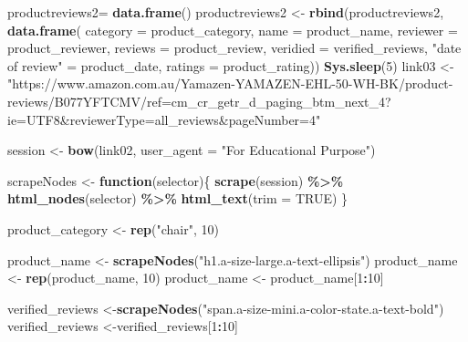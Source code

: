 \documentclass[
]{article}
\newenvironment{Shaded}{\begin{snugshade}}{\end{snugshade}}
\newcommand{\AttributeTok}[1]{\textcolor[rgb]{0.13,0.29,0.53}{#1}}
\newcommand{\ConstantTok}[1]{\textcolor[rgb]{0.56,0.35,0.01}{#1}}
\newcommand{\ControlFlowTok}[1]{\textcolor[rgb]{0.13,0.29,0.53}{\textbf{#1}}}
\newcommand{\DecValTok}[1]{\textcolor[rgb]{0.00,0.00,0.81}{#1}}
\newcommand{\FunctionTok}[1]{\textcolor[rgb]{0.13,0.29,0.53}{\textbf{#1}}}
\newcommand{\NormalTok}[1]{#1}
\newcommand{\OtherTok}[1]{\textcolor[rgb]{0.56,0.35,0.01}{#1}}
\newcommand{\SpecialCharTok}[1]{\textcolor[rgb]{0.81,0.36,0.00}{\textbf{#1}}}
\newcommand{\StringTok}[1]{\textcolor[rgb]{0.31,0.60,0.02}{#1}}
\begin{document}
\begin{Shaded}
\begin{Highlighting}[]
\NormalTok{  productreviews2}\OtherTok{=} \FunctionTok{data.frame}\NormalTok{()}
\NormalTok{  productreviews2 }\OtherTok{\textless{}{-}} \FunctionTok{rbind}\NormalTok{(productreviews2, }\FunctionTok{data.frame}\NormalTok{(}
                      \AttributeTok{category =}\NormalTok{ product\_category,}
                      \AttributeTok{name =}\NormalTok{ product\_name,}
                      \AttributeTok{reviewer =}\NormalTok{ product\_reviewer,}
                      \AttributeTok{reviews =}\NormalTok{ product\_review,}
                      \AttributeTok{veridied =}\NormalTok{ verified\_reviews,}
                      \StringTok{"date of review"} \OtherTok{=}\NormalTok{ product\_date,}
                      \AttributeTok{ratings =}\NormalTok{ product\_rating))}
   \FunctionTok{Sys.sleep}\NormalTok{(}\DecValTok{5}\NormalTok{)}
\NormalTok{link03 }\OtherTok{\textless{}{-}} \StringTok{"https://www.amazon.com.au/Yamazen{-}YAMAZEN{-}EHL{-}50{-}WH{-}BK/product{-}reviews/B077YFTCMV/ref=cm\_cr\_getr\_d\_paging\_btm\_next\_4?ie=UTF8\&reviewerType=all\_reviews\&pageNumber=4"}


\NormalTok{  session }\OtherTok{\textless{}{-}} \FunctionTok{bow}\NormalTok{(link02,}
               \AttributeTok{user\_agent =} \StringTok{"For Educational Purpose"}\NormalTok{)}

\NormalTok{  scrapeNodes }\OtherTok{\textless{}{-}} \ControlFlowTok{function}\NormalTok{(selector)\{}
    \FunctionTok{scrape}\NormalTok{(session) }\SpecialCharTok{\%\textgreater{}\%}
      \FunctionTok{html\_nodes}\NormalTok{(selector) }\SpecialCharTok{\%\textgreater{}\%}
      \FunctionTok{html\_text}\NormalTok{(}\AttributeTok{trim =} \ConstantTok{TRUE}\NormalTok{)}
\NormalTok{  \}}

\NormalTok{  product\_category }\OtherTok{\textless{}{-}} \FunctionTok{rep}\NormalTok{(}\StringTok{"chair"}\NormalTok{, }\DecValTok{10}\NormalTok{)}

\NormalTok{  product\_name }\OtherTok{\textless{}{-}} \FunctionTok{scrapeNodes}\NormalTok{(}\StringTok{"h1.a{-}size{-}large.a{-}text{-}ellipsis"}\NormalTok{)}
\NormalTok{  product\_name }\OtherTok{\textless{}{-}} \FunctionTok{rep}\NormalTok{(product\_name, }\DecValTok{10}\NormalTok{)}
\NormalTok{  product\_name }\OtherTok{\textless{}{-}}\NormalTok{ product\_name[}\DecValTok{1}\SpecialCharTok{:}\DecValTok{10}\NormalTok{]}
  
\NormalTok{  verified\_reviews }\OtherTok{\textless{}{-}}\FunctionTok{scrapeNodes}\NormalTok{(}\StringTok{"span.a{-}size{-}mini.a{-}color{-}state.a{-}text{-}bold"}\NormalTok{)}
\NormalTok{  verified\_reviews }\OtherTok{\textless{}{-}}\NormalTok{verified\_reviews[}\DecValTok{1}\SpecialCharTok{:}\DecValTok{10}\NormalTok{]}
  

\end{Highlighting}
\end{Shaded}
\end{document}
